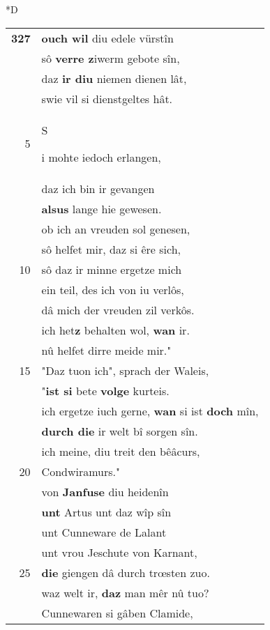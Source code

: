 \documentclass[8pt,a4paper,notitlepage]{article}
\begin{document}
\begin{table}[ht]
\begin{minipage}[t]{0.5\linewidth}
\small
\begin{center}*D
\end{center}
\begin{tabular}{rl}
\textbf{327} & \textbf{ouch wil} diu edele vürstîn\\ 
 & sô \textbf{verre z}iwerm gebote sîn,\\ 
 & daz \textbf{ir diu} niemen dienen lât,\\ 
 & swie vil si dienstgeltes hât.\\ 
5 & \begin{large}S\end{large}i mohte iedoch erlangen,\\ 
 & daz ich bin ir gevangen\\ 
 & \textbf{alsus} lange hie gewesen.\\ 
 & ob ich an vreuden sol genesen,\\ 
 & sô helfet mir, daz si êre sich,\\ 
10 & sô daz ir minne ergetze mich\\ 
 & ein teil, des ich von iu verlôs,\\ 
 & dâ mich der vreuden zil verkôs.\\ 
 & ich het\textbf{z} behalten wol, \textbf{wan} ir.\\ 
 & nû helfet dirre meide mir."\\ 
15 & "Daz tuon ich", sprach der Waleis,\\ 
 & "\textbf{ist si} bete \textbf{volge} kurteis.\\ 
 & ich ergetze iuch gerne, \textbf{wan} si ist \textbf{doch} mîn,\\ 
 & \textbf{durch die} ir welt bî sorgen sîn.\\ 
 & ich meine, diu treit den bêâcurs,\\ 
20 & Condwiramurs."\\ 
 & von \textbf{Janfuse} diu heidenîn\\ 
 & \textbf{unt} Artus unt daz wîp sîn\\ 
 & unt Cunneware de Lalant\\ 
 & unt vrou Jeschute von Karnant,\\ 
25 & \textbf{die} giengen dâ durch trœsten zuo.\\ 
 & waz welt ir, \textbf{daz} man mêr nû tuo?\\ 
 & Cunnewaren si gâben Clamide,\\ 

\end{tabular}
\end{minipage}
\end{table}
\end{document}
